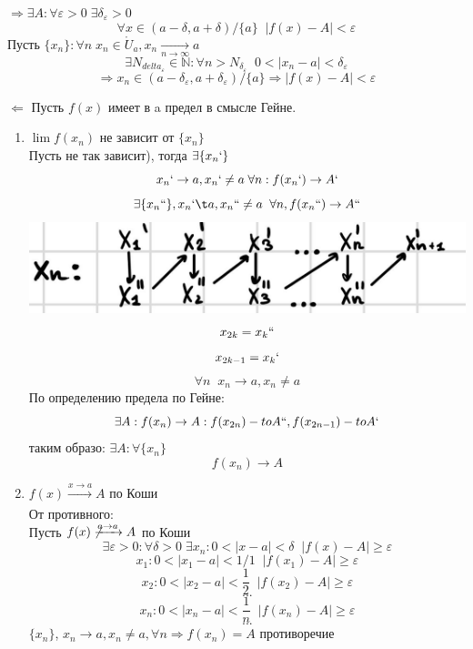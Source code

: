 \documentclass[12pt, paper]{article}
\newcommand{\N}{\mathbb{N}}
\newcommand{\eps}{\varepsilon}
\begin{document}
\begin{tcolorbox}[title=Доказательство]
	$\Rightarrow \exists A: \forall \eps > 0\; \exists \delta_\eps > 0$\\
	\[ \forall x \in (a - \delta, a + \delta) / \{a\} \;\; |f(x) - A| < \eps \]
	Пусть $\{ x_n \}: \forall n\; x_n \in \mathring U_a, x_n \xrightarrow[n \to \infty]{} a$
\[ \exists N_{delta_\eps} \in \N: \forall n > N_{\delta_\eps}\;\; 0 <|x_n - a| < \delta_\eps \]
\[ \Rightarrow x_n \in (a - \delta_\eps, a + \delta_\eps) / \{a\} \Rightarrow |f(x) - A| < \eps \]

	$\Leftarrow$ Пусть $f(x)$ имеет в a предел в смысле Гейне.
	\begin{enumerate}
	\item $\lim f(x_n)$ не зависит от $\{x_n\}$\\
		Пусть не так зависит), тогда $\exists \{x_n`\}$\\
		\[ x_n` \to a, x_n` \not= a \; \forall n: f(x_n`) \to A` \]
		\[ \exists \{ x_n ``\}, x_n` \t a, x_n`` \not = a\;\; \forall n, f(x_n``) \to A`` \]
		\includegraphics[width=0.5\linewidth]{images/Функции/Предел функции в точке/Гейне.jpg}
		\[ x_{2k} = x_k`` \]
		\[ x_{2k-1} = x_k` \]
		\[ \forall n\;\; x_n \to a, x_n \not = a \]
		По определению предела по Гейне:
		\[ \exists A: f(x_n) \to A: f(x_{2n}) - to A``, f(x_{2n-1}) - to A` \]
		таким образо: $ \exists A: \forall \{ x_n \} $
		\[ f(x_n) \to A \]
	\item $ f(x) \xrightarrow[]{x \to a} A $ по Коши\\
		От противного:\\
		Пусть $ f(x) \not \xrightarrow[]{a \to a} A$ по Коши
		\[ \exists \eps > 0: \forall \delta > 0\; \exists x_n: 0 < |x-a| < \delta\;\; |f(x) - A| \geq \eps \]
		\[ x_1: 0 < |x_1 - a| < 1/1\;\; |f(x_1) - A| \geq \eps \]
		\[ x_2: 0 < |x_2 - a| < \frac{1}{2}\;\; |f(x_2) - A| \geq \eps \]
		\[...\]
		\[ x_n: 0 < |x_n - a| < \frac{1}{n}\;\; |f(x_n) - A| \geq \eps \]
		\[...\]
		$ \{x_n\} $, $x_n \to a, x_n \not = a, \forall n \Rightarrow f(x_n) = A$ противоречие

	\end{enumerate}
\end{tcolorbox}
\end{document}
